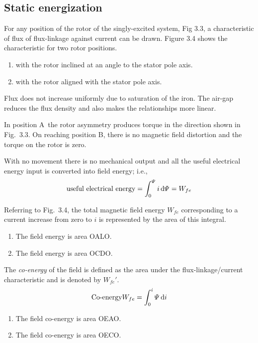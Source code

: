 \documentclass[a4paper,numbers=noenddot,12pt]{scrbook}
\begin{document}
\subsection{Static energization}
For any position of the rotor of the singly-excited system, Fig 3.3, a characteristic of flux of flux-linkage against current can be drawn. Figure 3.4 shows the characteristic for two rotor positions.
\begin{enumerate}[label={Position \Alph*:},leftmargin=3cm]
    \item with the rotor inclined at an angle to the stator pole axis.
    \item with the rotor aligned with the stator pole axis.
\end{enumerate}

Flux does not increase uniformly due to saturation of the iron. The air-gap reduces the flux density and also makes the relationships more linear.

In position A\ the rotor asymmetry produces torque in the direction shown in Fig.\ 3.3. On reaching position B, there is no magnetic field distortion and the torque on the rotor is zero.

With no movement there is no mechanical output and all the useful electrical energy input is converted into field energy; i.e.,
\begin{equation}
    \text{useful electrical energy} = \int_0^{\varPsi} i \dif \varPsi = W_{fe}
    \label{eq:Eq3.13}
\end{equation}

Referring to Fig.\ 3.4, the total magnetic field energy $W_{fe}$ corresponding to a current increase from zero to $i$ is represented by the area of this integral.
\begin{enumerate}[label={Position \Alph*:},leftmargin=3cm]
    \item The field energy is area OALO.\@
    \item The field energy is area OCDO.\@
\end{enumerate}

The \textit{co-energy} of the field is defined as the area under the flux-linkage/current characteristic and is denoted by $W_{fe}'$.
\begin{equation}
    \text{Co-energy} W_{fe} = \int_0^i \varPsi \dif i
    \label{eq:Eq3.14}
\end{equation}

\begin{enumerate}[label={Position \Alph*:},leftmargin=3cm]
    \item The field co-energy is area OEAO.\@
    \item The field co-energy is area OECO.\@
\end{enumerate}
\end{document}
